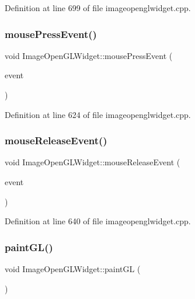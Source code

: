 Definition at line 699 of file imageopenglwidget.\+cpp.

\mbox{\label{class_image_open_g_l_widget_a96a4d8310e628c1ef7d1d1616f9161c8}} 
\subsubsection{\texorpdfstring{mousePressEvent()}{mousePressEvent()}}
{\footnotesize\ttfamily void Image\+Open\+G\+L\+Widget\+::mouse\+Press\+Event (\begin{DoxyParamCaption}\item[{Q\+Mouse\+Event $\ast$}]{event }\end{DoxyParamCaption})\hspace{0.3cm}{\ttfamily [protected]}}



Definition at line 624 of file imageopenglwidget.\+cpp.

\mbox{\label{class_image_open_g_l_widget_af77205be650a03c589cfeb5cfa3945f1}} 
\subsubsection{\texorpdfstring{mouseReleaseEvent()}{mouseReleaseEvent()}}
{\footnotesize\ttfamily void Image\+Open\+G\+L\+Widget\+::mouse\+Release\+Event (\begin{DoxyParamCaption}\item[{Q\+Mouse\+Event $\ast$}]{event }\end{DoxyParamCaption})\hspace{0.3cm}{\ttfamily [protected]}}



Definition at line 640 of file imageopenglwidget.\+cpp.

\mbox{\label{class_image_open_g_l_widget_a13c5d40cf7b52ff5ef13cd86475c9800}} 
\subsubsection{\texorpdfstring{paintGL()}{paintGL()}}
{\footnotesize\ttfamily void Image\+Open\+G\+L\+Widget\+::paint\+GL (\begin{DoxyParamCaption}{ }\end{DoxyParamCaption})\hspace{0.3cm}{\ttfamily [protected]}}



